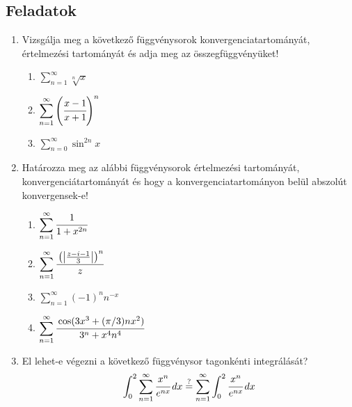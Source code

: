 \documentclass[a4paper, 12pt]{scrartcl}
\begin{document}
\clearpage
\subsection{Feladatok}
\begin{enumerate}
  \item Vizsgálja meg a következő függvénysorok konvergenciatartományát,
        értelmezési tartományát és adja meg az összegfüggvényüket!
        \begin{multicols}{3}
          \begin{enumerate}
            \item $\displaystyle
                    \sum_{n=1}^{\infty} \sqrt[n]{x}
                  $

            \item $\displaystyle
                    \sum_{n=1}^{\infty} \left(\cfrac{x-1}{x+1}\right)^n
                  $

            \item $\displaystyle
                    \sum_{n=0}^{\infty} \sin^{2n}x
                  $
          \end{enumerate}
        \end{multicols}

  \item Határozza meg az alábbi függvénysorok értelmezési tartományát,
        konvergenciátartományát és hogy a konvergenciatartományon belül abszolút
        konvergensek-e!
        \begin{multicols}{2}
          \begin{enumerate}
            \item $\displaystyle
                    \sum_{n=1}^{\infty} \cfrac{1}{1+x^{2n}}
                  $

            \item $\displaystyle
                    \sum_{n=1}^{\infty} \cfrac{\left(\left|\frac{z-i-1}{3}\right|\right)^n}{z}
                  $

            \item $\displaystyle
                    \sum_{n=1}^{\infty} (-1)^n n^{-x}
                  $

            \item $\displaystyle
                    \sum_{n=1}^{\infty} \cfrac{\cos (3x^3 +(\pi/3)nx^2)}{3^n +x^4n^4}
                  $
          \end{enumerate}
        \end{multicols}

  \item El lehet-e végezni a következő függvénysor tagonkénti integrálását?
        $$
          \int_0^2 \sum_{n=1}^{\infty} \cfrac{x^n}{e^{nx}}\, dx \overset{?}{=} \sum_{n=1}^{\infty} \int_0^2 \cfrac{x^n}{e^{nx}}\, dx
        $$


\end{enumerate}
\end{document}
